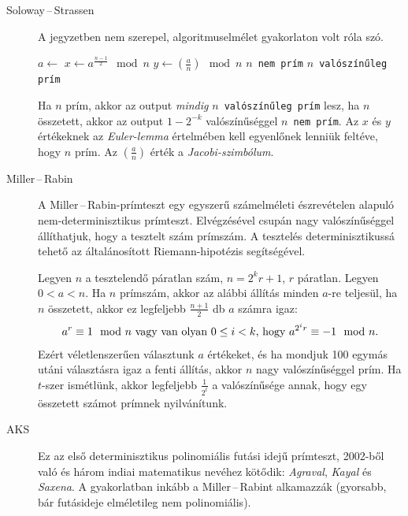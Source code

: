\documentclass[DIV=15,appendixprefix]{scrreprt}
\theoremstyle{definition}
\theoremstyle{remark}
\begin{document}
\begin{description}
	\item[Soloway\,--\,Strassen] A jegyzetben nem szerepel, algoritmuselmélet gyakorlaton volt róla
		szó.
		\begin{algorithmic}[1]
				\State $ a \gets $ 
				\State $ x \gets a^{ \frac{ n - 1 }{ 2 } } \mod{ n }$
				\State $y \gets \left( \frac{ a }{ n }  \right) \mod{n}$
					\State \Return \texttt{$ n $ nem prím}
				\EndIf
			\EndFor
			\State \Return \texttt{$ n $ valószínűleg prím}
		\end{algorithmic}
		Ha $ n $ prím, akkor az output \emph{mindig} \texttt{$ n $ valószínűleg prím} lesz, ha $ n $
		összetett, akkor az output $ 1 - 2^{ - k } $ valószínűséggel \texttt{$ n $ nem prím}. Az
		$ x $ és $ y $ értékeknek az \emph{Euler-lemma} értelmében kell egyenlőnek lenniük feltéve,
		hogy $ n $ prím. Az $ \left( \frac{ a }{ n } \right) $ érték a \emph{Jacobi-szimbólum}.

	\item[Miller\,--\,Rabin] A Miller\,--\,Rabin-prímteszt egy egyszerű számelméleti észrevételen
		alapuló nem-determinisztikus prímteszt. Elvégzésével csupán nagy valószínűséggel
		állíthatjuk, hogy  a tesztelt szám prímszám. A tesztelés determinisztikussá tehető az
		általánosított Riemann-hipotézis segítségével.

		Legyen $ n $ a tesztelendő páratlan szám, $ n = 2^{ k } r + 1 $, $ r $ páratlan. Legyen
		$ 0 < a < n $. Ha $ n $ prímszám, akkor az alábbi állítás minden $ a $-re teljesül, ha $ n $
		összetett, akkor ez legfeljebb $ \frac{ n+ 1 }{ 2 } $ db $ a $ számra igaz:
		\begin{equation*}
			a^{r}\equiv 1 \mod{n}\  \text{vagy van olyan $ 0 \le i < k $, hogy}\ a^{ 2^{ i } r }
			\equiv - 1 \mod{n}.
		\end{equation*}
		Ezért véletlenszerűen választunk $ a $ értékeket, és ha mondjuk 100 egymás utáni választásra
		igaz a fenti állítás, akkor $ n $ nagy valószínűséggel prím. Ha $ t $-szer ismétlünk, akkor
		legfeljebb $ \frac{ 1 }{ 2^{ t } } $ a valószínűsége annak, hogy egy összetett számot
		prímnek nyilvánítunk.
	\item[AKS] Ez az első determinisztikus polinomiális futási idejű prímteszt, 2002-ből való és
		három indiai matematikus nevéhez kötődik: \emph{Agraval}, \emph{Kayal} és \emph{Saxena}. A
		gyakorlatban inkább a Miller\,--\,Rabint alkamazzák (gyorsabb, bár futásideje elméletileg
		nem polinomiális).


\end{description}
\end{document}
